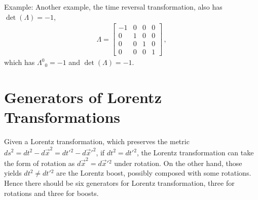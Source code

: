 \documentclass[11pt, onesided]{book}
\theoremstyle{break}
\theoremstyle{break}
\newcommand{\bmat}[1]{\begin{bmatrix} #1 \end{bmatrix}}
\newcommand{\example}{\color{green}Example: \color{black}}
\begin{document}
\example Another example, the time reversal transformation, also has $\det(\Lambda) = -1$,
\begin{align*}
\Lambda = \bmat{-1 & 0 & 0& 0\\
0 & 1 & 0 & 0 \\
0 & 0 & 1 & 0\\
0 & 0 & 0 & 1}\,,
\end{align*}
which has $\Lambda^0{}_0 = -1$ and $\det(\Lambda) = -1$.\\

\section[Generators of Lorentz Transformations]{\color{red} Generators of Lorentz Transformations \color{black}}
Given a Lorentz transformation, which preserves the metric $ds^2 = dt^2 - d\vec{x}^2 = dt'{}^2 - d\vec{x}'^2$, if $dt^2 = dt'{}^2$, the Lorentz transformation can take the form of rotation as $d\vec{x}^2 = d\vec{x}'{}^2$ under rotation. On the other hand, those yields $dt^2 \neq dt'{}^2$ are the Lorentz boost, possibly composed with some rotations. Hence there should be six generators for Lorentz transformation, three for rotations and three for boosts.  \\
\end{document}
